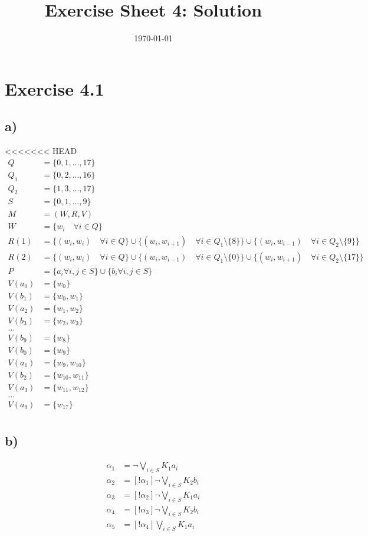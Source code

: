 \documentclass[a4paper]{article}
\begin{document}
\title{Exercise Sheet 4: Solution}
\author{}
\date{\today}

\section{Exercise 4.1}
\subsection{a)}
<<<<<<< HEAD
\begin{align*}
Q &= \{0, 1, ..., 17\}\\
Q_1 &= \{0, 2, ..., 16\}\\
Q_2 &= \{1, 3, ..., 17\}\\
S &= \{0, 1, ..., 9\}\\
M &= (W, R, V)\\
W &= \{w_i \quad\forall i \in Q\}\\
R(1) &= \{(w_i, w_i) \quad \forall i \in Q\} \cup
        \{(w_i, w_{i + 1}) \quad\forall i \in Q_1 \setminus \{8\}\} \cup
        \{(w_i, w_{i - 1}) \quad\forall i \in Q_2 \setminus \{9\}\}\\
R(2) &= \{(w_i, w_i) \quad \forall i \in Q\} \cup
        \{(w_i, w_{i - 1}) \quad\forall i \in Q_1 \setminus \{0\}\} \cup
        \{(w_i, w_{i + 1}) \quad\forall i \in Q_2 \setminus \{17\}\}\\
P &= \{a_i \forall i, j \in S\} \cup \{b_i \forall i, j \in S\}\\
V(a_0) &= \{w_0\}\\
V(b_1) &= \{w_0, w_1\}\\
V(a_2) &= \{w_1, w_2\}\\
V(b_3) &= \{w_2, w_3\}\\
...\\
V(b_9) &= \{w_8\}\\
V(b_0) &= \{w_9\}\\
V(a_1) &= \{w_9, w_{10}\}\\
V(b_2) &= \{w_{10}, w_{11}\}\\
V(a_3) &= \{w_{11}, w_{12}\}\\
...\\
V(a_9) &= \{w_{17}\}\\
\end{align*}

\subsection{b)}
\begin{align*}
\alpha_1 &= \lnot \bigvee_{i \in S} K_1 a_i\\
\alpha_2 &= [!\alpha_1]\lnot \bigvee_{i \in S} K_2 b_i\\
\alpha_3 &= [!\alpha_2]\lnot \bigvee_{i \in S} K_1 a_i\\
\alpha_4 &= [!\alpha_3]\lnot \bigvee_{i \in S} K_2 b_i\\
\alpha_5 &= [!\alpha_4] \bigvee_{i \in S} K_1 a_i\\
\end{align*}
\end{document}
